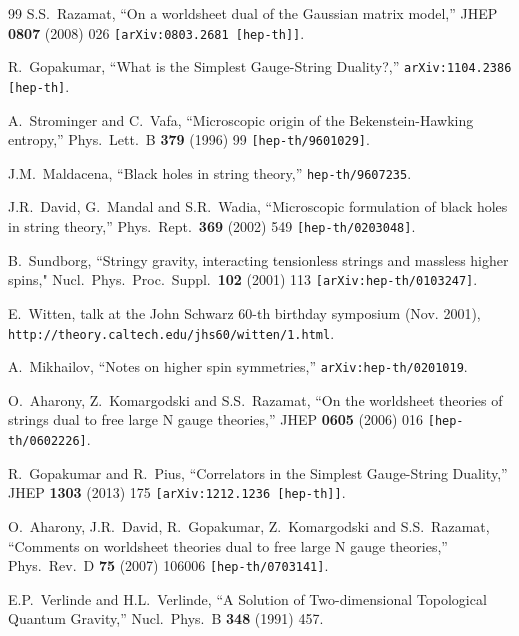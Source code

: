 \documentclass[12pt,a4paper]{article}
\begin{document}
\begin{thebibliography}{99}
S.S.~Razamat,
``On a worldsheet dual of the Gaussian matrix model,''
JHEP {\bf 0807} (2008) 026 
{\tt  [arXiv:0803.2681 [hep-th]]}. 
  
R.~Gopakumar,
``What is the Simplest Gauge-String Duality?,''
{\tt  arXiv:1104.2386 [hep-th]}. 

A.~Strominger and C.~Vafa,
``Microscopic origin of the Bekenstein-Hawking entropy,''
Phys.\ Lett.\ B {\bf 379} (1996) 99 
{\tt  [hep-th/9601029]}.
  
J.M.~Maldacena,
``Black holes in string theory,''
{\tt hep-th/9607235}. 
  
J.R.~David, G.~Mandal and S.R.~Wadia,
``Microscopic formulation of black holes in string theory,''
Phys.\ Rept.\  {\bf 369} (2002) 549
{\tt [hep-th/0203048]}. 

B.~Sundborg,
``Stringy gravity, interacting tensionless strings and massless higher spins,"
Nucl.\ Phys.\ Proc.\ Suppl.\  {\bf 102} (2001) 113
{\tt [arXiv:hep-th/0103247]}.
  
E.~Witten, talk at the John Schwarz 60-th birthday symposium (Nov. 2001), \newline
{\tt http://theory.caltech.edu/jhs60/witten/1.html}.

A.~Mikhailov,
``Notes on higher spin symmetries,''
{\tt arXiv:hep-th/0201019}.

O.~Aharony, Z.~Komargodski and S.S.~Razamat,
``On the worldsheet theories of strings dual to free large N gauge theories,''
JHEP {\bf 0605} (2006) 016 
{\tt  [hep-th/0602226]}.
 
R.~Gopakumar and R.~Pius,
``Correlators in the Simplest Gauge-String Duality,''
JHEP {\bf 1303}  (2013) 175
{\tt  [arXiv:1212.1236 [hep-th]]}.
 
O.~Aharony, J.R.~David, R.~Gopakumar, Z.~Komargodski and S.S.~Razamat,
``Comments on worldsheet theories dual to free large N gauge theories,''
Phys.\ Rev.\ D {\bf 75} (2007) 106006 
{\tt  [hep-th/0703141]}. 

E.P.~Verlinde and H.L.~Verlinde,
``A Solution of Two-dimensional Topological Quantum Gravity,''
Nucl.\ Phys.\ B {\bf 348} (1991) 457.
  

\end{thebibliography}
\end{document}
